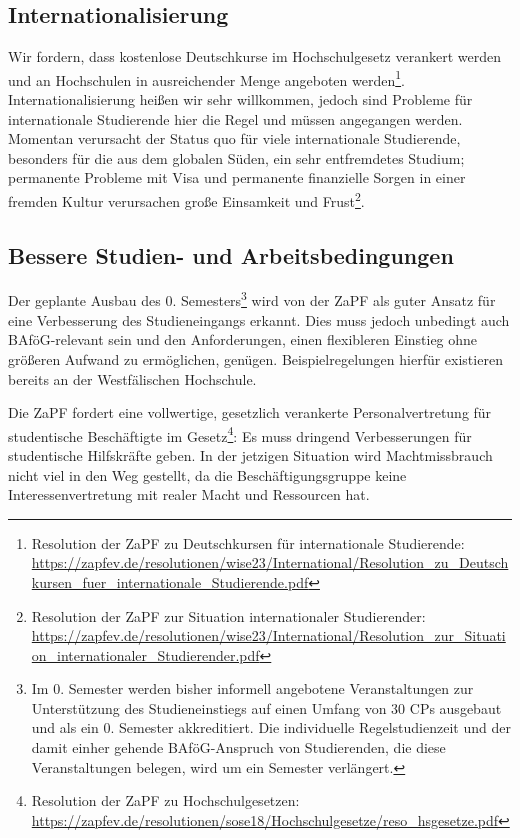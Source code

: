 \documentclass[DIV=calc]{scrartcl}
\begin{document}
\subsection*{Internationalisierung}

Wir fordern, dass kostenlose Deutschkurse im Hochschulgesetz verankert werden und an Hochschulen in ausreichender Menge angeboten werden\footnote{Resolution der ZaPF zu Deutschkursen für internationale Studierende: \url{https://zapfev.de/resolutionen/wise23/International/Resolution\_zu\_Deutschkursen\_fuer\_internationale\_Studierende.pdf}}. Internationalisierung heißen wir sehr willkommen, jedoch sind Probleme für internationale Studierende hier die Regel und müssen angegangen werden. Momentan verursacht der Status quo für viele internationale Studierende, besonders für die aus dem globalen Süden, ein sehr entfremdetes Studium;  permanente Probleme mit Visa und permanente finanzielle Sorgen in einer fremden Kultur verursachen große Einsamkeit und Frust\footnote{Resolution der ZaPF zur Situation internationaler Studierender: \url{https://zapfev.de/resolutionen/wise23/International/Resolution_zur_Situation_internationaler_Studierender.pdf}}.

\subsection*{Bessere Studien- und Arbeitsbedingungen}
Der geplante Ausbau des 0. Semesters\footnote{Im 0. Semester werden bisher informell angebotene Veranstaltungen zur Unterstützung des Studieneinstiegs auf einen Umfang von 30 CPs ausgebaut und als ein 0. Semester akkreditiert. Die individuelle Regelstudienzeit und der damit einher gehende BAföG-Anspruch von Studierenden, die diese Veranstaltungen belegen, wird um ein Semester verlängert.} wird von der ZaPF als guter Ansatz für eine Verbesserung des Studieneingangs erkannt. Dies muss jedoch unbedingt auch BAföG-relevant sein und den Anforderungen, einen flexibleren Einstieg ohne größeren Aufwand zu ermöglichen, genügen. Beispielregelungen hierfür existieren bereits an der Westfälischen Hochschule.

Die ZaPF fordert eine vollwertige, gesetzlich verankerte Personalvertretung für studentische Beschäftigte im Gesetz\footnote{Resolution der ZaPF zu Hochschulgesetzen: \url{https://zapfev.de/resolutionen/sose18/Hochschulgesetze/reso\_hsgesetze.pdf}}: Es muss dringend Verbesserungen für studentische Hilfskräfte geben. In der jetzigen Situation wird Machtmissbrauch nicht viel in den Weg gestellt, da die Beschäftigungsgruppe keine Interessenvertretung mit realer Macht und Ressourcen hat.
\end{document}
